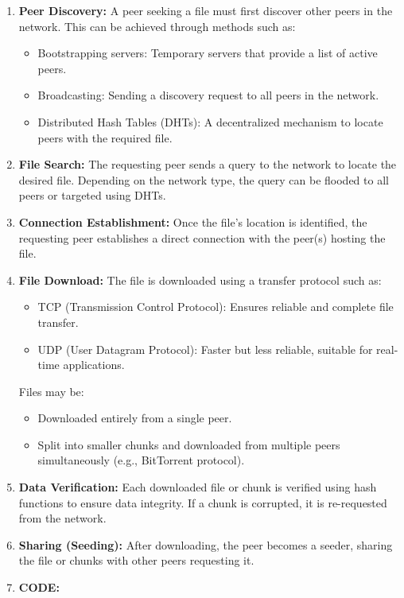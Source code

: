 \begin{enumerate}
    \item \textbf{Peer Discovery:}
    A peer seeking a file must first discover other peers in the network. This can be achieved through methods such as:
    \begin{itemize}
        \item Bootstrapping servers: Temporary servers that provide a list of active peers.
        \item Broadcasting: Sending a discovery request to all peers in the network.
        \item Distributed Hash Tables (DHTs): A decentralized mechanism to locate peers with the required file.
    \end{itemize}

    \item \textbf{File Search:}
    The requesting peer sends a query to the network to locate the desired file. Depending on the network type, the query can be flooded to all peers or targeted using DHTs.

    \item \textbf{Connection Establishment:}
    Once the file’s location is identified, the requesting peer establishes a direct connection with the peer(s) hosting the file.

    \item \textbf{File Download:}
    The file is downloaded using a transfer protocol such as:
    \begin{itemize}
        \item TCP (Transmission Control Protocol): Ensures reliable and complete file transfer.
        \item UDP (User Datagram Protocol): Faster but less reliable, suitable for real-time applications.
    \end{itemize}
    Files may be:
    \begin{itemize}
        \item Downloaded entirely from a single peer.
        \item Split into smaller chunks and downloaded from multiple peers simultaneously (e.g., BitTorrent protocol).
    \end{itemize}

    \item \textbf{Data Verification:}
    Each downloaded file or chunk is verified using hash functions to ensure data integrity. If a chunk is corrupted, it is re-requested from the network.

    \item \textbf{Sharing (Seeding):}
    After downloading, the peer becomes a seeder, sharing the file or chunks with other peers requesting it.
    \item \textbf{CODE:}
\end{enumerate}

